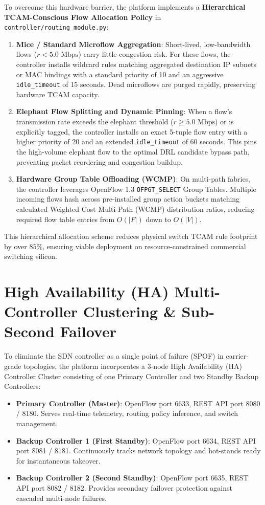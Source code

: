 To overcome this hardware barrier, the platform implements a \textbf{Hierarchical TCAM-Conscious Flow Allocation Policy} in \texttt{controller/routing\_module.py}:
\begin{enumerate}
    \item \textbf{Mice / Standard Microflow Aggregation}: Short-lived, low-bandwidth flows ($r < 5.0\text{ Mbps}$) carry little congestion risk. For these flows, the controller installs wildcard rules matching aggregated destination IP subnets or MAC bindings with a standard priority of 10 and an aggressive \texttt{idle\_timeout} of 15 seconds. Dead microflows are purged rapidly, preserving hardware TCAM capacity.
    \item \textbf{Elephant Flow Splitting and Dynamic Pinning}: When a flow's transmission rate exceeds the elephant threshold ($r \ge 5.0\text{ Mbps}$) or is explicitly tagged, the controller installs an exact 5-tuple flow entry with a higher priority of 20 and an extended \texttt{idle\_timeout} of 60 seconds. This pins the high-volume elephant flow to the optimal DRL candidate bypass path, preventing packet reordering and congestion buildup.
    \item \textbf{Hardware Group Table Offloading (WCMP)}: On multi-path fabrics, the controller leverages OpenFlow 1.3 \texttt{OFPGT\_SELECT} Group Tables. Multiple incoming flows hash across pre-installed group action buckets matching calculated Weighted Cost Multi-Path (WCMP) distribution ratios, reducing required flow table entries from $O(|F|)$ down to $O(|V|)$.
\end{enumerate}
This hierarchical allocation scheme reduces physical switch TCAM rule footprint by over $85\%$, ensuring viable deployment on resource-constrained commercial switching silicon.

\section{High Availability (HA) Multi-Controller Clustering \& Sub-Second Failover}
\label{sec:ha_controller_clustering}
To eliminate the SDN controller as a single point of failure (SPOF) in carrier-grade topologies, the platform incorporates a 3-node High Availability (HA) Controller Cluster consisting of one Primary Controller and two Standby Backup Controllers:
\begin{itemize}
    \item \textbf{Primary Controller (Master)}: OpenFlow port 6633, REST API port 8080 / 8180. Serves real-time telemetry, routing policy inference, and switch management.
    \item \textbf{Backup Controller 1 (First Standby)}: OpenFlow port 6634, REST API port 8081 / 8181. Continuously tracks network topology and hot-stands ready for instantaneous takeover.
    \item \textbf{Backup Controller 2 (Second Standby)}: OpenFlow port 6635, REST API port 8082 / 8182. Provides secondary failover protection against cascaded multi-node failures.
\end{itemize}

